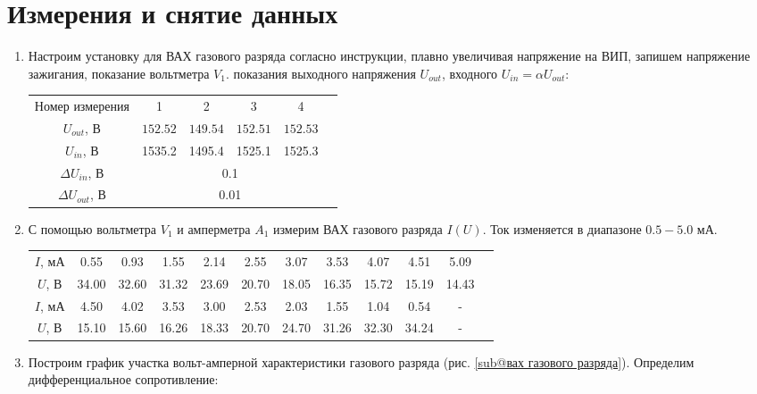 \documentclass[a4paper, 12pt]{article}
\begin{document}
\section*{Измерения и снятие данных}
\begin{enumerate}
    \item Настроим установку для ВАХ газового разряда согласно инструкции, плавно увеличивая напряжение на ВИП, запишем напряжение
    зажигания, показание вольтметра $V_{1}$. показания выходного напряжения $U_{out}$, входного $U_{in} = \alpha U_{out}$:
    \begin{center}
        \begin{tabular}{|c|c|c|c|c|c|}
            \hline
            Номер измерения & 1 & 2 & 3 & 4\\
            $U_{out}$, В & $152.52$ & $149.54$ & $152.51$ & $152.53$\\
            $U_{in}$, В & 1535.2 & 1495.4 & 1525.1 & 1525.3\\
            \hline
            $\Delta U_{in}$, В & \multicolumn{4}{|c|}{0.1}\\
            $\Delta U_{out}$, В & \multicolumn{4}{|c|}{0.01}\\
            \hline
        \end{tabular}
    \end{center}
    \item С помощью вольтметра $V_{1}$ и амперметра $A_{1}$ измерим ВАХ газового разряда $I(U)$. Ток изменяется в диапазоне $0.5 - 5.0$ мА.
    \begin{center}
        \begin{tabular}{|c|c|c|c|c|c|c|c|c|c|c|c|}
            \hline
            $I$, мА & 0.55 & 0.93 & 1.55 & 2.14 & 2.55 & 3.07 & 3.53 & 4.07 & 4.51 & 5.09\\
            $U$, В & 34.00 & 32.60 & 31.32 & 23.69 & 20.70 & 18.05 & 16.35 & 15.72 & 15.19 & 14.43\\
            \hline
            $I$, мА & 4.50 & 4.02 & 3.53 & 3.00 & 2.53 & 2.03 & 1.55 & 1.04 & 0.54 & -\\
            $U$, В & 15.10 & 15.60 & 16.26 & 18.33 & 20.70 & 24.70 & 31.26 & 32.30 & 34.24 & -\\
            \hline
        \end{tabular}
    \end{center}
    \item Построим график участка вольт-амперной характеристики газового разряда (рис. \ref{sub@вах газового разряда}). Определим дифференциальное сопротивление:

\end{enumerate}
\end{document}
